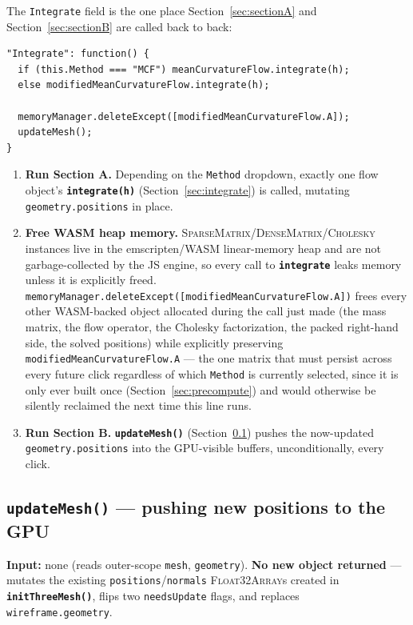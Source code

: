 \documentclass[11pt]{article}
\newcommand{\code}[1]{\texttt{#1}}
\newcommand{\func}[1]{\texttt{\textbf{#1}}}
\newcommand{\type}[1]{\textsc{#1}}
\begin{document}
The \code{Integrate} field is the one place Section~\ref{sec:sectionA} and
Section~\ref{sec:sectionB} are called back to back:
\begin{lstlisting}
"Integrate": function() {
  if (this.Method === "MCF") meanCurvatureFlow.integrate(h);
  else modifiedMeanCurvatureFlow.integrate(h);

  memoryManager.deleteExcept([modifiedMeanCurvatureFlow.A]);
  updateMesh();
}
\end{lstlisting}
\begin{enumerate}[leftmargin=1.6em]
\item \textbf{Run Section A.} Depending on the \code{Method} dropdown, exactly one flow
  object's \func{integrate(h)} (Section~\ref{sec:integrate}) is called, mutating
  \code{geometry.positions} in place.
\item \textbf{Free WASM heap memory.} \type{SparseMatrix}/\type{DenseMatrix}/\type{Cholesky}
  instances live in the emscripten/WASM linear-memory heap and are not garbage-collected by
  the JS engine, so every call to \func{integrate} leaks memory unless it is explicitly
  freed. \code{memoryManager.deleteExcept([modifiedMeanCurvatureFlow.A])} frees every other
  WASM-backed object allocated during the call just made (the mass matrix, the flow
  operator, the Cholesky factorization, the packed right-hand side, the solved positions)
  while explicitly preserving \code{modifiedMeanCurvatureFlow.A} --- the one matrix that
  must persist across every future click regardless of which \code{Method} is currently
  selected, since it is only ever built once (Section~\ref{sec:precompute}) and would
  otherwise be silently reclaimed the next time this line runs.
\item \textbf{Run Section B.} \func{updateMesh()} (Section~\ref{sec:updatemesh}) pushes the
  now-updated \code{geometry.positions} into the GPU-visible buffers, unconditionally, every
  click.
\end{enumerate}

\subsection{\func{updateMesh()} --- pushing new positions to the GPU}
\label{sec:updatemesh}
\textbf{Input:} none (reads outer-scope \code{mesh}, \code{geometry}). \textbf{No new
object returned} --- mutates the existing \code{positions}/\code{normals}
\type{Float32Array}s created in \func{initThreeMesh()}, flips two
\code{needsUpdate} flags, and replaces \code{wireframe.geometry}.
\end{document}
